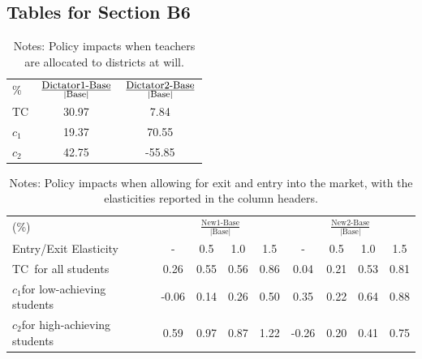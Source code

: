 \documentclass[notitlepage,12pt]{article}%
\begin{document}
\pagebreak

\subsection{Tables for Section B6}

\begin{table}[bh]
\caption{Allocating Teachers at Will}%
\label{tab:will}
\begin{center}%
\begin{tabular}
[c]{lcc}\hline\hline
{\small \%} & $\frac{\text{{\small Dictator1-Base}}}{\left\vert
\text{{\footnotesize Base}}\right\vert }$ & $\frac
{\text{{\small Dictator2-Base}}}{\left\vert \text{{\footnotesize Base}%
}\right\vert }$\\
{\small TC} & {\small 30.97} & {\small 7.84}\\
$c_{1}$ & {\small 19.37} & {\small 70.55}\\
$c_{2}$ & {\small 42.75} & {\small -55.85}\\\hline\hline
\end{tabular}
\end{center}
\par
\caption*{{\footnotesize Notes: Policy impacts when teachers are allocated
to districts at will.}}\end{table}

\begin{table}[ptb]
\caption{State-Funded Teacher Bonuses: Extensive Margin}%
\label{tab:ext_marg}
\begin{center}%
\begin{tabular}
[c]{lcccccccc}\hline\hline
{\small (\%)} & \multicolumn{4}{c}{$\frac{\text{New1-Base}}{\left\vert
\text{Base}\right\vert }$} & \multicolumn{4}{c}{$\frac{\text{New2-Base}%
}{\left\vert \text{Base}\right\vert }$}\\
{\small Entry/Exit Elasticity} & {\small -} & {\small 0.5} & {\small 1.0} &
{\small 1.5} & {\small -} & {\small 0.5} & {\small 1.0} & {\small 1.5}\\\hline
{\small TC\ for all students} & {\small 0.26} & {\small 0.55} & {\small 0.56}
& {\small 0.86} & {\small 0.04} & {\small 0.21} & {\small 0.53} &
{\small 0.81}\\
$c_{1}${\small for low-achieving students} & {\small -0.06} & {\small 0.14} &
{\small 0.26} & {\small 0.50} & {\small 0.35} & {\small 0.22} & {\small 0.64}
& {\small 0.88}\\
$c_{2}${\small for high-achieving students} & {\small 0.59} & {\small 0.97} &
{\small 0.87} & {\small 1.22} & {\small -0.26} & {\small 0.20} & {\small 0.41}
& {\small 0.75}\\\hline\hline
\end{tabular}
\end{center}
\par
\caption*{{\footnotesize Notes: Policy impacts when allowing for exit and
entry into the market, with the elasticities reported in the column headers.}}\end{table}
\end{document}
